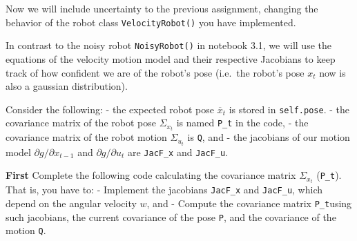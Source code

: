 \documentclass[11pt]{article}
\begin{document}
Now we will include uncertainty to the previous assignment, changing the
behavior of the robot class \texttt{VelocityRobot()} you have
implemented.

In contrast to the noisy robot \texttt{NoisyRobot()} in notebook 3.1, we
will use the equations of the velocity motion model and their respective
Jacobians to keep track of how confident we are of the robot's pose
(i.e.~the robot's pose \(x_t\) now is also a gaussian distribution).

Consider the following: - the expected robot pose \(\overline{x}_t\) is
stored in \texttt{self.pose}. - the covariance matrix of the robot pose
\(\Sigma_{x_t}\) is named \texttt{P\_t} in the code, - the covariance
matrix of the robot motion \(\Sigma_{u_t}\) is \texttt{Q}, and - the
jacobians of our motion model \(\partial g / \partial x_{t-1}\) and
\(\partial g / \partial u_{t}\) are \texttt{JacF\_x} and
\texttt{JacF\_u}.

    \textbf{First} Complete the following code calculating the covariance
matrix \(\Sigma_{x_t}\) (\texttt{P\_t}). That is, you have to: -
Implement the jacobians \texttt{JacF\_x} and \texttt{JacF\_u}, which
depend on the angular velocity \(w\), and - Compute the covariance
matrix \texttt{P\_t}using such jacobians, the current covariance of the
pose \texttt{P}, and the covariance of the motion \texttt{Q}.
\end{document}
